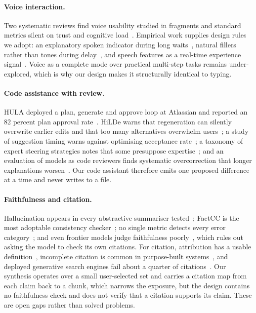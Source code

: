 \paragraph{Voice interaction.}
Two systematic reviews find voice usability studied in fragments and standard metrics silent on trust and cognitive load~\cite{deshmukh2024vui,dutsinma2022vareview}. Empirical work supplies design rules we adopt: an explanatory spoken indicator during long waits~\cite{speech2025waiting}, natural fillers rather than tones during delay~\cite{fillers2025mitigating}, and speech features as a real-time experience signal~\cite{ma2026beyondwords}. Voice as a complete mode over practical multi-step tasks remains under-explored, which is why our design makes it structurally identical to typing.

\paragraph{Code assistance with review.}
HULA deployed a plan, generate and approve loop at Atlassian and reported an 82 percent plan approval rate~\cite{takerngsaksiri2025hula}. HiLDe warns that regeneration can silently overwrite earlier edits and that too many alternatives overwhelm users~\cite{gonzalez2025hilde}; a study of suggestion timing warns against optimising acceptance rate~\cite{mozannar2024whento}; a taxonomy of expert steering strategies notes that some presuppose expertise~\cite{chidambaram2024sohf}; and an evaluation of models as code reviewers finds systematic overcorrection that longer explanations worsen~\cite{jin2026reliable}. Our code assistant therefore emits one proposed difference at a time and never writes to a file.

\paragraph{Faithfulness and citation.}
Hallucination appears in every abstractive summariser tested~\cite{maynez2020faithfulness}; FactCC is the most adoptable consistency checker~\cite{kryscinski2020evaluating}; no single metric detects every error category~\cite{pagnoni2021understanding}; and even frontier models judge faithfulness poorly~\cite{laban2023summedits}, which rules out asking the model to check its own citations. For citation, attribution has a usable definition~\cite{rashkin2023measuring}, incomplete citation is common in purpose-built systems~\cite{gao2023enabling}, and deployed generative search engines fail about a quarter of citations~\cite{liu2023evaluating}. Our synthesis operates over a small user-selected set and carries a citation map from each claim back to a chunk, which narrows the exposure, but the design contains no faithfulness check and does not verify that a citation supports its claim. These are open gaps rather than solved problems.

